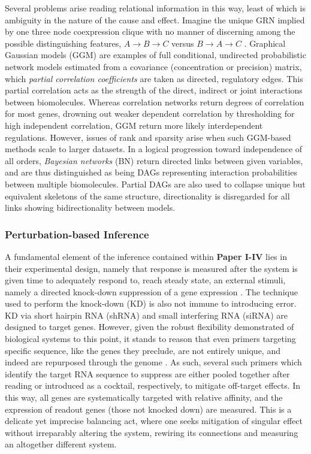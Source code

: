 Several problems arise reading relational information in this way, least of which is ambiguity in the nature of the cause and effect. Imagine the unique GRN implied by one three node coexpression clique with no manner of discerning among the possible distinguishing features, \eg $A\to B\to C$ versus $ B\to A\to C$ \citep{markowetz2007inferring}.
Graphical Gaussian models (GGM) are examples of full conditional, undirected probabilistic network models estimated from a covariance (\ie concentration or precision) matrix, which \emph{partial correlation coefficients} are taken as directed, regulatory edges. This partial correlation acts as the strength of the direct, indirect or joint interactions between biomolecules. Whereas correlation networks return degrees of correlation for most genes, drowning out weaker dependent correlation by thresholding for high independent correlation, GGM return more likely interdependent regulations\citep{schafer2004empirical}. However, issues of rank and sparsity arise when such GGM-based methods scale to larger datasets. In a logical progression toward independence of all orders, \emph{Bayesian networks} (BN) return directed links between given variables, and are thus distinguished as being DAGs representing interaction probabilities between multiple biomolecules. Partial DAGs are also used to collapse unique but equivalent skeletons of the same structure, \ie directionality is disregarded for all links showing bidirectionality between models.


\subsubsection{Perturbation-based Inference}
\label{sec:ODE}
A fundamental element of the inference contained within \textbf{Paper I-IV} lies in their experimental design, namely that response is measured after the system is given time to adequately respond to, \ie reach steady state, an external stimuli, namely a directed knock-down suppression of a gene expression \citep{pinna2010knockouts,oates2012network,yip2010improved}. The technique used to perform the knock-down (KD) is also not immune to introducing error. KD via short hairpin RNA (shRNA) and small interfering RNA (siRNA) are designed to target genes. However, given the robust flexibility demonstrated of biological systems to this point, it stands to reason that even primers targeting specific sequence, like the genes they preclude, are not entirely unique, and indeed are repurposed through the genome \citep{ye2012primer}. As such, several such primers which identify the target RNA sequence to suppress are either pooled together after reading or introduced as a cocktail, respectively, to mitigate off-target effects. In this way, all genes are systematically targeted with relative affinity, and the expression of readout genes (those not knocked down) are measured. This is a delicate yet imprecise balancing act, where one seeks mitigation of singular effect without irreparably altering the system, rewiring its connections and measuring an altogether different system. 

